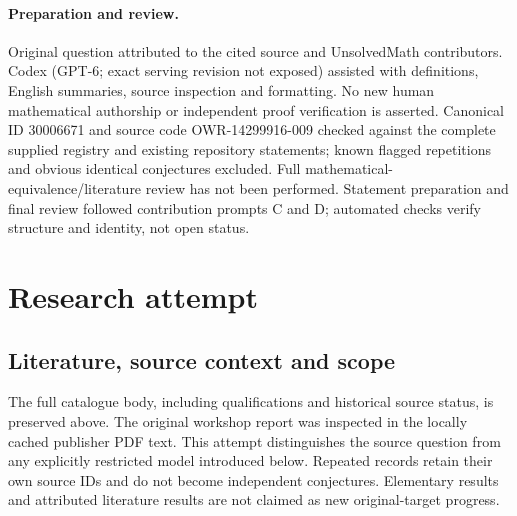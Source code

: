 \documentclass[11pt]{article}
\begin{document}
\paragraph{Preparation and review.}
Original question attributed to the cited source and UnsolvedMath contributors. Codex (GPT-6; exact serving revision not exposed) assisted with definitions, English summaries, source inspection and formatting. No new human mathematical authorship or independent proof verification is asserted. Canonical ID 30006671 and source code OWR-14299916-009 checked against the complete supplied registry and existing repository statements; known flagged repetitions and obvious identical conjectures excluded. Full mathematical-equivalence/literature review has not been performed. Statement preparation and final review followed contribution prompts C and D; automated checks verify structure and identity, not open status.
\label{end:30006671}

\section{Research attempt}
\subsection{Literature, source context and scope}
The full catalogue body, including qualifications and historical source status, is preserved above. The original workshop report was inspected in the locally cached publisher PDF text. This attempt distinguishes the source question from any explicitly restricted model introduced below. Repeated records retain their own source IDs and do not become independent conjectures. Elementary results and attributed literature results are not claimed as new original-target progress.
\end{document}
